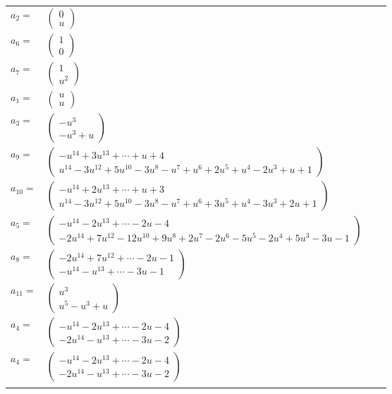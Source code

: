 \documentclass[1p]{elsarticle_modified}
\theoremstyle{definition}
\begin{document}
\begin{tabular}{m{7pt} m{180pt} m{7pt} m{180pt} }
\flushright $a_{2}=$&$\begin{pmatrix}0\\u\end{pmatrix}$ \\
\flushright $a_{6}=$&$\begin{pmatrix}1\\0\end{pmatrix}$ \\
\flushright $a_{7}=$&$\begin{pmatrix}1\\u^2\end{pmatrix}$ \\
\flushright $a_{1}=$&$\begin{pmatrix}u\\u\end{pmatrix}$ \\
\flushright $a_{3}=$&$\begin{pmatrix}- u^3\\- u^3+u\end{pmatrix}$ \\
\flushright $a_{9}=$&$\begin{pmatrix}- u^{14}+3 u^{13}+\cdots+u+4\\u^{14}-3 u^{12}+5 u^{10}-3 u^8- u^7+u^6+2 u^5+u^4-2 u^3+u+1\end{pmatrix}$ \\
\flushright $a_{10}=$&$\begin{pmatrix}- u^{14}+2 u^{13}+\cdots+u+3\\u^{14}-3 u^{12}+5 u^{10}-3 u^8- u^7+u^6+3 u^5+u^4-3 u^3+2 u+1\end{pmatrix}$ \\
\flushright $a_{5}=$&$\begin{pmatrix}- u^{14}-2 u^{13}+\cdots-2 u-4\\-2 u^{14}+7 u^{12}-12 u^{10}+9 u^8+2 u^7-2 u^6-5 u^5-2 u^4+5 u^3-3 u-1\end{pmatrix}$ \\
\flushright $a_{8}=$&$\begin{pmatrix}-2 u^{14}+7 u^{12}+\cdots-2 u-1\\- u^{14}- u^{13}+\cdots-3 u-1\end{pmatrix}$ \\
\flushright $a_{11}=$&$\begin{pmatrix}u^3\\u^5- u^3+u\end{pmatrix}$ \\
\flushright $a_{4}=$&$\begin{pmatrix}- u^{14}-2 u^{13}+\cdots-2 u-4\\-2 u^{14}- u^{13}+\cdots-3 u-2\end{pmatrix}$\\ \flushright $a_{4}=$&$\begin{pmatrix}- u^{14}-2 u^{13}+\cdots-2 u-4\\-2 u^{14}- u^{13}+\cdots-3 u-2\end{pmatrix}$\\&\end{tabular}
\end{document}
